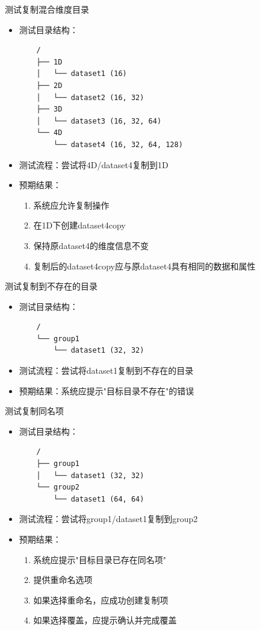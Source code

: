 \documentclass[a4paper,12pt]{report}	%
\begin{document}
测试复制混合维度目录
\begin{itemize}
    \item 测试目录结构：
    \begin{verbatim}
    /
    ├── 1D
    │   └── dataset1 (16)
    ├── 2D
    │   └── dataset2 (16, 32)
    ├── 3D
    │   └── dataset3 (16, 32, 64)
    └── 4D
        └── dataset4 (16, 32, 64, 128)
    \end{verbatim}
    \item 测试流程：尝试将4D/dataset4复制到1D
    \item 预期结果：
    \begin{enumerate}
        \item 系统应允许复制操作
        \item 在1D下创建dataset4\textunderscore copy
        \item 保持原dataset4的维度信息不变
        \item 复制后的dataset4\textunderscore copy应与原dataset4具有相同的数据和属性
    \end{enumerate}
\end{itemize}

测试复制到不存在的目录
\begin{itemize}
    \item 测试目录结构：
    \begin{verbatim}
    /
    └── group1
        └── dataset1 (32, 32)
    \end{verbatim}
    \item 测试流程：尝试将dataset1复制到不存在的目录
    \item 预期结果：系统应提示"目标目录不存在"的错误
\end{itemize}

测试复制同名项
\begin{itemize}
    \item 测试目录结构：
    \begin{verbatim}
    /
    ├── group1
    │   └── dataset1 (32, 32)
    └── group2
        └── dataset1 (64, 64)
    \end{verbatim}
    \item 测试流程：尝试将group1/dataset1复制到group2
    \item 预期结果：
    \begin{enumerate}
        \item 系统应提示"目标目录已存在同名项"
        \item 提供重命名选项
        \item 如果选择重命名，应成功创建复制项
        \item 如果选择覆盖，应提示确认并完成覆盖
    \end{enumerate}
\end{itemize}
\end{document}
